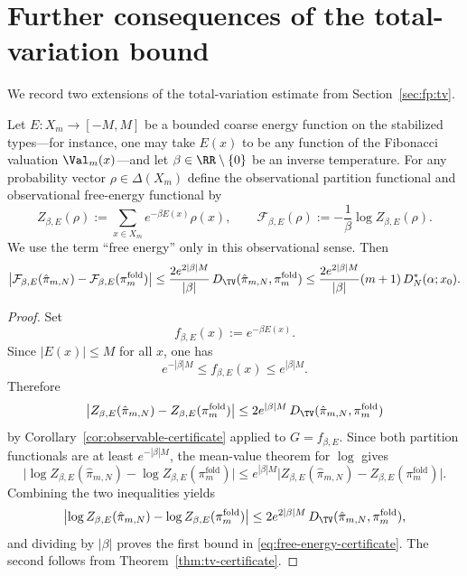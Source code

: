 \section{Further consequences of the total-variation bound}\label{app:tv-extensions}

We record two extensions of the total-variation estimate from Section~\ref{sec:fp:tv}.

\begin{theorem}\label{thm:free-energy-certificate}
Let $E:X_m\to[-M,M]$ be a bounded coarse energy function on the stabilized types---for instance, one may take $E(x)$ to be any function of the Fibonacci valuation $\Val_m(x)$---and let $\beta\in\RR\setminus\{0\}$ be an inverse temperature. For any probability vector $\rho\in\Delta(X_m)$ define the observational partition functional and observational free-energy functional by
\[
Z_{\beta,E}(\rho):=\sum_{x\in X_m} e^{-\beta E(x)}\rho(x),
\qquad
\mathcal F_{\beta,E}(\rho):=-\frac{1}{\beta}\log Z_{\beta,E}(\rho).
\]
We use the term ``free energy'' only in this observational sense.
Then
\begin{equation}\label{eq:free-energy-certificate}
\bigl|
\mathcal F_{\beta,E}(\hat{\pi}_{m,N})
-
\mathcal F_{\beta,E}(\pi_m^{\mathrm{fold}})
\bigr|
\le
\frac{2e^{2|\beta|M}}{|\beta|}\,
D_{\TV}(\hat{\pi}_{m,N},\pi_m^{\mathrm{fold}})
\le
\frac{2e^{2|\beta|M}}{|\beta|}(m+1)\,D_N^*(\alpha;x_0).
\end{equation}
\end{theorem}

\begin{proof}
Set
\[
f_{\beta,E}(x):=e^{-\beta E(x)}.
\]
Since $|E(x)|\le M$ for all $x$, one has
\[
e^{-|\beta|M}\le f_{\beta,E}(x)\le e^{|\beta|M}.
\]
Therefore
\[
\bigl|Z_{\beta,E}(\hat{\pi}_{m,N})-Z_{\beta,E}(\pi_m^{\mathrm{fold}})\bigr|
\le
2e^{|\beta|M}\,D_{\TV}(\hat{\pi}_{m,N},\pi_m^{\mathrm{fold}})
\]
by Corollary~\ref{cor:observable-certificate} applied to $G=f_{\beta,E}$. Since both partition functionals are at least $e^{-|\beta|M}$, the mean-value theorem for $\log$ gives
\[
\bigl|
\log Z_{\beta,E}(\hat{\pi}_{m,N})
-
\log Z_{\beta,E}(\pi_m^{\mathrm{fold}})
\bigr|
\le
e^{|\beta|M}
\bigl|Z_{\beta,E}(\hat{\pi}_{m,N})-Z_{\beta,E}(\pi_m^{\mathrm{fold}})\bigr|.
\]
Combining the two inequalities yields
\[
\bigl|
\log Z_{\beta,E}(\hat{\pi}_{m,N})
-
\log Z_{\beta,E}(\pi_m^{\mathrm{fold}})
\bigr|
\le
2e^{2|\beta|M}\,D_{\TV}(\hat{\pi}_{m,N},\pi_m^{\mathrm{fold}}),
\]
and dividing by $|\beta|$ proves the first bound in \eqref{eq:free-energy-certificate}. The second follows from Theorem~\ref{thm:tv-certificate}.
\end{proof}

